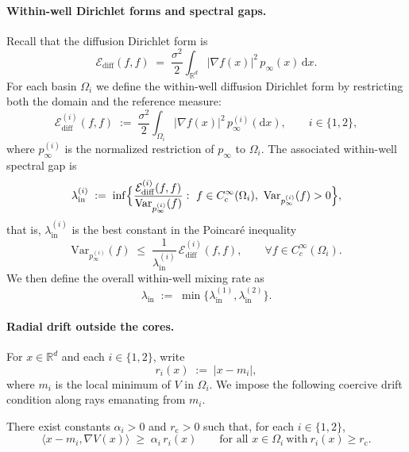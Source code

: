 \paragraph{Within-well Dirichlet forms and spectral gaps.}
Recall that the diffusion Dirichlet form is
\[
\mathcal E_{\mathrm{diff}}(f,f)
\;=\;
\frac{\sigma^2}{2}\int_{\mathbb R^d} |\nabla f(x)|^2\,p_\infty(x)\,\mathrm dx.
\]
For each basin \(\Omega_i\) we define the within-well diffusion Dirichlet form
by restricting both the domain and the reference measure:
\[
\mathcal E_{\mathrm{diff}}^{(i)}(f,f)
\;:=\;
\frac{\sigma^2}{2}\int_{\Omega_i} |\nabla f(x)|^2\,p_\infty^{(i)}(\mathrm dx),
\qquad
i\in\{1,2\},
\]
where \(p_\infty^{(i)}\) is the normalized restriction of \(p_\infty\) to \(\Omega_i\).
The associated within-well spectral gap is
\[
\lambda_{\mathrm{in}}^{(i)}
\;:=\;
\inf\Bigl\{
\frac{\mathcal E_{\mathrm{diff}}^{(i)}(f,f)}{\mathrm{Var}_{p_\infty^{(i)}}(f)}
:\ f\in C_c^\infty(\Omega_i),\ \mathrm{Var}_{p_\infty^{(i)}}(f)>0
\Bigr\},
\]
that is, \(\lambda_{\mathrm{in}}^{(i)}\) is the best constant in the Poincar\'e
inequality
\begin{equation}\label{eq:local-Poincare-well}
\mathrm{Var}_{p_\infty^{(i)}}(f)
\;\le\;
\frac{1}{\lambda_{\mathrm{in}}^{(i)}}\,\mathcal E_{\mathrm{diff}}^{(i)}(f,f),
\qquad
\forall f\in C_c^\infty(\Omega_i).
\end{equation}
We then define the overall within-well mixing rate as
\[
\lambda_{\mathrm{in}}
\;:=\;
\min\bigl\{\lambda_{\mathrm{in}}^{(1)},\lambda_{\mathrm{in}}^{(2)}\bigr\}.
\]

\paragraph{Radial drift outside the cores.}
For \(x\in\mathbb R^d\) and each \(i\in\{1,2\}\), write
\[
r_i(x) \;:=\; |x-m_i|,
\]
where \(m_i\) is the local minimum of \(V\) in \(\Omega_i\).
We impose the following coercive drift condition along rays emanating from \(m_i\).

\begin{assumption}\label{ass:drift-outside-core}
There exist constants \(\alpha_i>0\) and \(r_{\mathrm c}>0\) such that, for each
\(i\in\{1,2\}\),
\begin{equation}\label{eq:drift-condition-core}
\bigl\langle x-m_i,\nabla V(x)\bigr\rangle
\;\ge\;
\alpha_i\,r_i(x)
\qquad
\text{for all }x\in\Omega_i\ \text{with}\ r_i(x)\ge r_{\mathrm c}.
\end{equation}
\end{assumption}

